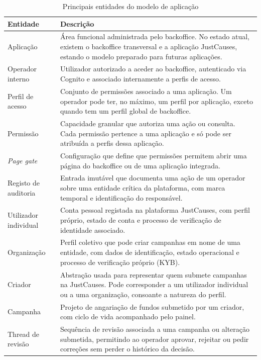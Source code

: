 \begin{table}[H]
\caption{Principais entidades do modelo de aplicação}
\label{tab:entidades_dominio}
\begin{center}
\footnotesize
\begin{tabular}{|l|p{9cm}|}
\hline
\textbf{Entidade} & \textbf{Descrição} \\ \hline
Aplicação         & Área funcional administrada pelo backoffice. No estado atual, existem o backoffice transversal e a aplicação JustCauses, estando o modelo preparado para futuras aplicações. \\ \hline
Operador interno  & Utilizador autorizado a aceder ao backoffice, autenticado via Cognito e associado internamente a perfis de acesso. \\ \hline
Perfil de acesso  & Conjunto de permissões associado a uma aplicação. Um operador pode ter, no máximo, um perfil por aplicação, exceto quando tem um perfil global de backoffice. \\ \hline
Permissão         & Capacidade granular que autoriza uma ação ou consulta. Cada permissão pertence a uma aplicação e só pode ser atribuída a perfis dessa aplicação. \\ \hline
\textit{Page gate} & Configuração que define que permissões permitem abrir uma página do backoffice ou de uma aplicação integrada. \\ \hline
Registo de auditoria & Entrada imutável que documenta uma ação de um operador sobre uma entidade crítica da plataforma, com marca temporal e identificação do responsável. \\ \hline
Utilizador individual & Conta pessoal registada na plataforma JustCauses, com perfil próprio, estado de conta e processo de verificação de identidade associado. \\ \hline
Organização       & Perfil coletivo que pode criar campanhas em nome de uma entidade, com dados de identificação, estado operacional e processo de verificação próprio (\gls{KYB}). \\ \hline
Criador           & Abstração usada para representar quem submete campanhas na JustCauses. Pode corresponder a um utilizador individual ou a uma organização, consoante a natureza do perfil. \\ \hline
Campanha          & Projeto de angariação de fundos submetido por um criador, com ciclo de vida acompanhado pelo painel. \\ \hline
Thread de revisão & Sequência de revisão associada a uma campanha ou alteração submetida, permitindo ao operador aprovar, rejeitar ou pedir correções sem perder o histórico da decisão. \\ \hline

\end{tabular}
\end{center}
\end{table}
